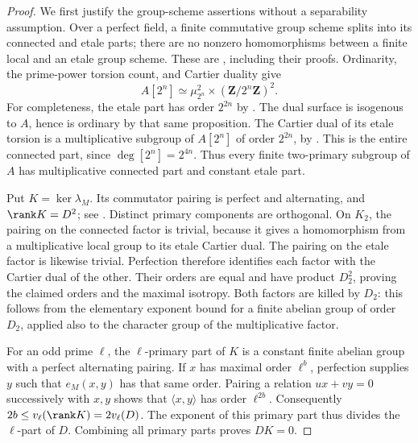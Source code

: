 \begin{proof}
We first justify the group-scheme assertions without a separability
assumption.  Over a perfect field, a finite commutative group scheme
splits into its connected and etale parts; there are no nonzero
homomorphisms between a finite local and an etale group scheme.
These are \cite[Lemma~4.44 and Proposition~4.45, p.~67]
{EdixhovenVanDerGeerMoonenAV}, including their proofs.
Ordinarity, the prime-power torsion count, and Cartier duality give
\[
              A[2^n]\simeq\mu_{2^n}^{2}
                      \times(\mathbf Z/2^n\mathbf Z)^2.
\]
For completeness, the etale part has order $2^{2n}$ by
\cite[Proposition~5.22, pp.~80--81]{EdixhovenVanDerGeerMoonenAV}.
The dual surface is isogenous to $A$, hence is ordinary by that
same proposition.  The Cartier dual of its etale torsion is a
multiplicative subgroup of $A[2^n]$ of order $2^{2n}$, by
\cite[Corollary~7.17, p.~104]{EdixhovenVanDerGeerMoonenAV}.
This is the entire connected part, since $\deg[2^n]=2^{4n}$.
Thus every finite two-primary subgroup of $A$ has multiplicative
connected part and constant etale part.

Put $K=\ker\lambda_M$.  Its commutator pairing is perfect and
alternating, and $\rank K=D^2$; see
\cite[Proposition~8.19 and Corollary~8.20, p.~119]
{EdixhovenVanDerGeerMoonenAV}.
Distinct primary components are orthogonal.  On $K_2$, the pairing
on the connected factor is trivial, because it gives a homomorphism
from a multiplicative local group to its etale Cartier dual.
The pairing on the etale factor is likewise trivial.  Perfection
therefore identifies each factor with the Cartier dual of the other.
Their orders are equal and have product $D_2^2$, proving the claimed
orders and the maximal isotropy.  Both factors are killed by $D_2$:
this follows from the elementary exponent bound for a finite abelian
group of order $D_2$, applied also to the character group of the
multiplicative factor.

For an odd prime $\ell$, the $\ell$-primary part of $K$ is a
constant finite abelian group with a perfect alternating pairing.
If $x$ has maximal order $\ell^b$, perfection supplies $y$ such
that $e_M(x,y)$ has that same order.  Pairing a relation
$ux+vy=0$ successively with $x,y$ shows that $\langle x,y\rangle$
has order $\ell^{2b}$.  Consequently
$2b\le v_\ell(\rank K)=2v_\ell(D)$.
The exponent of this primary part thus divides the $\ell$-part
of $D$.  Combining all primary parts proves $DK=0$.
\end{proof}

